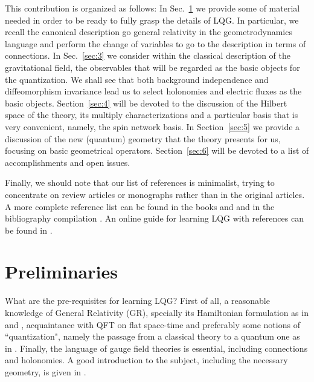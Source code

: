 \documentclass[aps,prd,tightenlines,showpacs,nofootinbib,preprint]{revtex4}
\begin{document}
This contribution is organized as follows: In Sec.~\ref{sec:2} we
provide some of material needed in order to be ready to fully
grasp the details of LQG. In particular, we recall the canonical
description go general relativity in the geometrodynamics language
and perform the change of variables to go to the description in
terms of connections. In Sec.~\ref{sec:3} we consider within the
classical description of the gravitational field, the observables
that will be regarded as the basic objects for the quantization.
We shall see that both background independence and diffeomorphism
invariance lead us to select holonomies and electric fluxes as the
basic objects. Section~\ref{sec:4} will be devoted to the
discussion of the Hilbert space of the theory, its multiply
characterizations and a particular basis that is very convenient,
namely, the spin network basis. In Section~\ref{sec:5} we provide
a discussion of the new (quantum) geometry that the theory
presents for us, focusing on basic geometrical operators.
Section~\ref{sec:6} will be devoted to a list of accomplishments
and open issues.

Finally,  we should note that our list of references is
minimalist, trying to concentrate on review articles or monographs
rather than in the original articles. A more complete reference
list can be found in the books \cite{Thiemann:2001yy} and
\cite{Rovelli:2004tv} and in the bibliography compilation
\cite{biblio}. An online guide for learning LQG with references
can be found in \cite{seth2}.


\section{Preliminaries}
\label{sec:2}



\noindent What are the pre-requisites for learning LQG? First of
all, a reasonable knowledge of General Relativity (GR), specially
its Hamiltonian formulation as in \cite{wald1} and \cite{poisson},
acquaintance with QFT on flat space-time and preferably some
notions of ``quantization", namely the passage from a classical
theory to a quantum one as in \cite{wald2}. Finally, the language
of gauge field theories is essential, including connections and
holonomies. A good introduction to the subject, including the
necessary geometry, is given in \cite{baez}.
\end{document}
